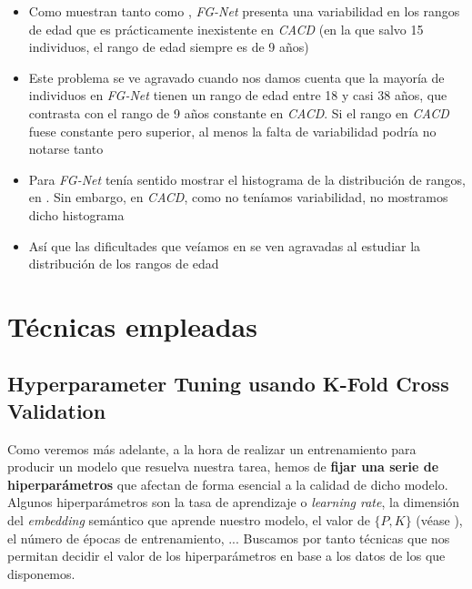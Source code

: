 \begin{itemize}
    \item Como muestran tanto  como , \textit{FG-Net} presenta una variabilidad en los rangos de edad que es prácticamente inexistente en \textit{CACD} (en la que salvo 15 individuos, el rango de edad siempre es de 9 años)
    \item Este problema se ve agravado cuando nos damos cuenta que la mayoría de individuos en \textit{FG-Net} tienen un rango de edad entre 18 y casi 38 años, que contrasta con el rango de 9 años constante en \textit{CACD}. Si el rango en \textit{CACD} fuese constante pero superior, al menos la falta de variabilidad podría no notarse tanto
    \item Para \textit{FG-Net} tenía sentido mostrar el histograma de la distribución de rangos, en . Sin embargo, en \textit{CACD}, como no teníamos variabilidad, no mostramos dicho histograma
    \item Así que las dificultades que veíamos en  se ven agravadas al estudiar la distribución de los rangos de edad
\end{itemize}

\section{Técnicas empleadas}

\subsection{Hyperparameter Tuning usando K-Fold Cross Validation} \label{isec:hptuning_kfold_cross_validation}

Como veremos más adelante, a la hora de realizar un entrenamiento para producir un modelo que resuelva nuestra tarea, hemos de \textbf{fijar una serie de hiperparámetros} que afectan de forma esencial a la calidad de dicho modelo. Algunos hiperparámetros son la tasa de aprendizaje o \textit{learning rate}, la dimensión del \textit{embedding} semántico que aprende nuestro modelo, el valor de $\{P, K\}$ (véase ), el número de épocas de entrenamiento, ... Buscamos por tanto técnicas que nos permitan decidir el valor de los hiperparámetros en base a los datos de los que disponemos.


